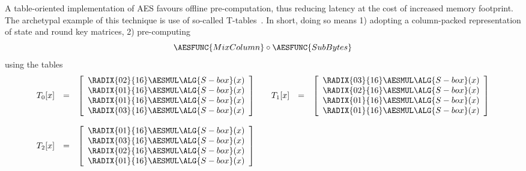 A  table-oriented implementation of AES favours
offline pre-computation,
thus reducing 
latency
at the cost of increased 
memory footprint.
The archetypal example of this technique is use of so-called
T-tables~\cite[Section 4.2]{DaeRij:02}.
In short, doing so means
1) adopting a 
   column-packed
   representation of state and round key matrices,
2) pre-computing
   \[
   \AESFUNC{MixColumn} \circ \AESFUNC{SubBytes}
   \]
   using the tables
   \[
   \begin{array}{cc}
   \begin{array}{lcl}
   T_0[x] &=& \left[\begin{array}{c}
                    \RADIX{02}{16} \AESMUL \ALG{S-box}( x ) \\
                    \RADIX{01}{16} \AESMUL \ALG{S-box}( x ) \\
                    \RADIX{01}{16} \AESMUL \ALG{S-box}( x ) \\
                    \RADIX{03}{16} \AESMUL \ALG{S-box}( x ) \\
                    \end{array} \right]
   \end{array}
   &
   \begin{array}{lcl}
   T_1[x] &=& \left[\begin{array}{c}
                    \RADIX{03}{16} \AESMUL \ALG{S-box}( x ) \\
                    \RADIX{02}{16} \AESMUL \ALG{S-box}( x ) \\
                    \RADIX{01}{16} \AESMUL \ALG{S-box}( x ) \\
                    \RADIX{01}{16} \AESMUL \ALG{S-box}( x ) \\
                    \end{array} \right]
   \end{array}
   \\\\
   \begin{array}{lcl}
   T_2[x] &=& \left[\begin{array}{c}
                    \RADIX{01}{16} \AESMUL \ALG{S-box}( x ) \\
                    \RADIX{03}{16} \AESMUL \ALG{S-box}( x ) \\
                    \RADIX{02}{16} \AESMUL \ALG{S-box}( x ) \\
                    \RADIX{01}{16} \AESMUL \ALG{S-box}( x ) \\
                    \end{array} \right]                 

\end{array}
\end{array}\]
